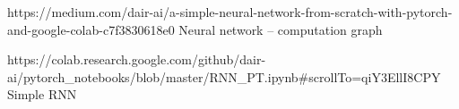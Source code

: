 https://medium.com/dair-ai/a-simple-neural-network-from-scratch-with-pytorch-and-google-colab-c7f3830618e0
Neural network -- computation graph


https://colab.research.google.com/github/dair-ai/pytorch_notebooks/blob/master/RNN_PT.ipynb#scrollTo=qiY3EllI8CPY
Simple RNN


